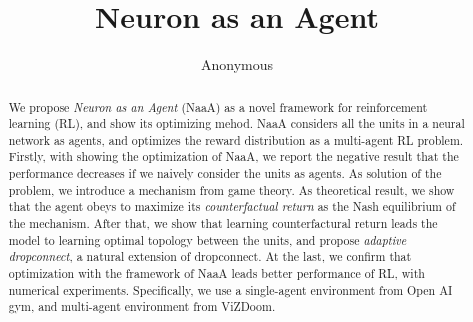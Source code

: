 \documentclass{article} %
\title{Neuron as an Agent}
\author{Anonymous}
\begin{document}
\maketitle

\begin{abstract}
We propose {\em Neuron as an Agent} (NaaA) as a novel framework for reinforcement learning (RL), and show its optimizing mehod.
NaaA considers all the units in a neural network as agents, and optimizes the reward distribution as a multi-agent RL problem.
Firstly, with showing the optimization of NaaA, we report the negative result that the performance decreases if we naively consider the units as agents.
As solution of the problem, we introduce a mechanism from game theory.
As theoretical result, we show that the agent obeys to maximize its {\em counterfactual return} as the Nash equilibrium of the mechanism.
After that, we show that learning counterfactural return leads the model to learning optimal topology between the units,
and propose {\em adaptive dropconnect}, a natural extension of dropconnect.
At the last, we confirm that optimization with the framework of NaaA leads better performance of RL, with numerical experiments.
Specifically, we use a single-agent environment from Open AI gym, and multi-agent environment from ViZDoom.
\end{abstract}













\end{document}
